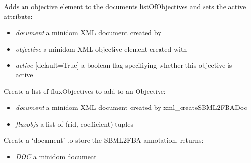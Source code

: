 \documentclass[a4paper,11pt,english]{sphinxmanual}
\begin{document}

\begin{fulllineitems}
\label{modules_doc:cbmpy.CBXML.xml_addSBML2FBAObjective}
Adds an objective element to the documents listOfObjectives and sets the active attribute:
\begin{itemize}
\item {} 
\emph{document} a minidom XML document created by 

\item {} 
\emph{objective} a minidom XML objective element created with 

\item {} 
\emph{active} {[}default=True{]} a boolean flag specifiying whether this objective is active

\end{itemize}

\end{fulllineitems}


\begin{fulllineitems}
\label{modules_doc:cbmpy.CBXML.xml_createListOfFluxObjectives}
Create a list of fluxObjectives to add to an Objective:
\begin{itemize}
\item {} 
\emph{document} a minidom XML document created by xml\_createSBML2FBADoc

\item {} 
\emph{fluxobjs} a list of (rid, coefficient) tuples

\end{itemize}

\end{fulllineitems}


\begin{fulllineitems}
\label{modules_doc:cbmpy.CBXML.xml_createSBML2FBADoc}
Create a `document' to store the SBML2FBA annotation, returns:
\begin{itemize}
\item {} 
\emph{DOC} a minidom document

\end{itemize}

\end{fulllineitems}
\end{document}
